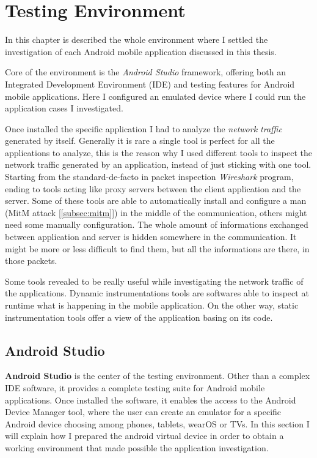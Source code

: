 \chapter{Testing Environment}
\label{chap:testing_environment}
	
	\par In this chapter is described the whole environment where I settled the investigation of each Android mobile application discussed in this thesis.
	\par Core of the environment is the \textit{Android Studio} framework, offering both an Integrated Development Environment (IDE) and testing features for Android mobile applications. Here I configured an emulated device where I could run the application cases I investigated.
	\par Once installed the specific application I had to analyze the \textit{network traffic} generated by itself. Generally it is rare a single tool is perfect for all the applications to analyze, this is the reason why I used different tools to inspect the network traffic generated by an application, instead of just sticking with one tool. Starting from the standard-de-facto in packet inspection \textit{Wireshark} program, ending to tools acting like proxy servers between the client application and the server. Some of these tools are able to automatically install and configure a man (MitM attack [\ref{subsec:mitm}]) in the middle of the communication, others might need some manually configuration. \newline
	The whole amount of informations exchanged between application and server is hidden somewhere in the communication. It might be more or less difficult to find them, but all the informations are there, in those packets.
	\par Some tools revealed to be really useful while investigating the network traffic of the applications. Dynamic instrumentations tools are softwares able to inspect at runtime what is happening in the mobile application. On the other way, static instrumentation tools offer a view of the application basing on its code.
	
	\section{Android Studio}
		\par \textbf{Android Studio} is the center of the testing environment. Other than a complex IDE software, it provides a complete testing suite for Android mobile applications. Once installed the software, it enables the access to the Android Device Manager tool, where the user can create an emulator for a specific Android device choosing among phones, tablets, wearOS or TVs. 
		In this section I will explain how I prepared the android virtual device in order to obtain a working environment that made possible the application investigation.
		
